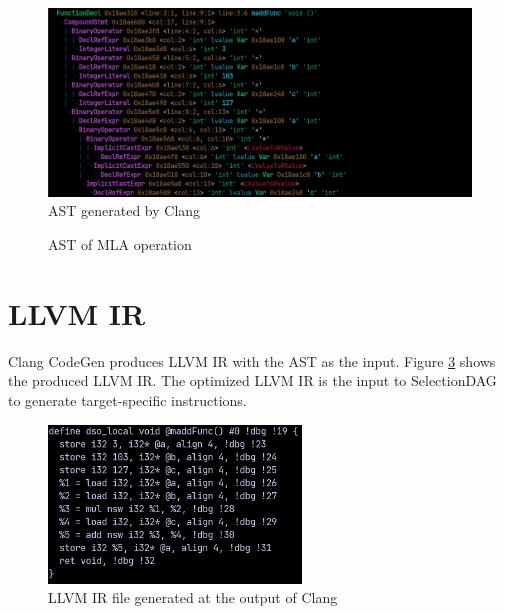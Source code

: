 \begin{figure}
    \centering
    \includegraphics[width=\textwidth]{path_instruction/madd_clang_ast_cropped.png}
    \caption{AST generated by Clang}
    \label{fig:clang_ast}
\end{figure}
\begin{figure}
    \centering
{}
    \caption{AST of MLA operation}
    \label{fig:ast_mla}
\end{figure}
\section{LLVM IR}
Clang CodeGen produces LLVM IR with the AST as the input. Figure \ref{fig:llvm_ir} shows the produced LLVM IR. The optimized LLVM IR is the input to SelectionDAG to generate target-specific instructions.  
\par
\begin{figure}
    \centering
    \includegraphics[width=0.6\textwidth]{path_instruction/madd_ll.png}
    \caption{LLVM IR file generated at the output of Clang}
    \label{fig:llvm_ir}
\end{figure}

